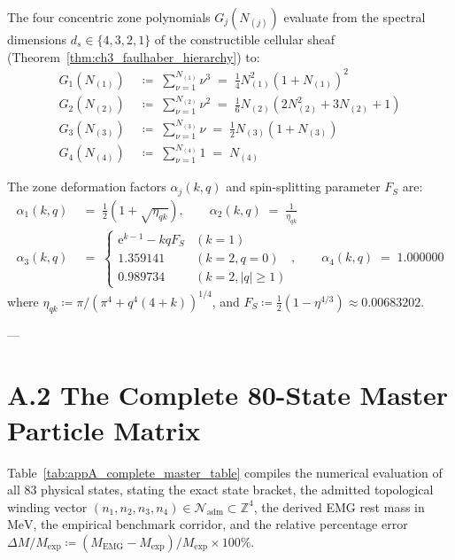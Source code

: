 \documentclass[
    12pt,
    a4paper,
    headings=normal,
    twoside=false,
    open=any,
    parskip=half
]{scrbook}
\newcommand{\eu}{\mathrm{e}}
\newcommand{\spectrumN}{\mathcal{N}_{\text{adm}}}
\begin{document}
The four concentric zone polynomials $G_j(N_{(j)})$ evaluate from the spectral dimensions $d_s \in \{4, 3, 2, 1\}$ of the constructible cellular sheaf (Theorem~\ref{thm:ch3_faulhaber_hierarchy}) to:
\begin{align}
G_1(N_{(1)}) &\;\coloneqq\; \sum_{\nu=1}^{N_{(1)}} \nu^3 \;=\; \frac{1}{4} N_{(1)}^2 \left( 1 + N_{(1)} \right)^2 \label{eq:appA_G1_def} \\
G_2(N_{(2)}) &\;\coloneqq\; \sum_{\nu=1}^{N_{(2)}} \nu^2 \;=\; \frac{1}{6} N_{(2)} \left( 2 N_{(2)}^2 + 3 N_{(2)} + 1 \right) \label{eq:appA_G2_def} \\
G_3(N_{(3)}) &\;\coloneqq\; \sum_{\nu=1}^{N_{(3)}} \nu \;=\; \frac{1}{2} N_{(3)} \left( 1 + N_{(3)} \right) \label{eq:appA_G3_def} \\
G_4(N_{(4)}) &\;\coloneqq\; \sum_{\nu=1}^{N_{(4)}} 1 \;=\; N_{(4)} \label{eq:appA_G4_def}
\end{align}

The zone deformation factors $\alpha_j(k, q)$ and spin-splitting parameter $F_S$ are:
\begin{align}
\alpha_1(k, q) &\;=\; \frac{1}{2}\left( 1 + \sqrt{\eta_{qk}} \right), \qquad \alpha_2(k, q) \;=\; \frac{1}{\eta_{qk}} \label{eq:appA_alpha12_def} \\
\alpha_3(k, q) &\;=\; \begin{cases} \eu^{k-1} - k q F_S & (k = 1) \\ 1.359141 & (k = 2, q = 0) \\ 0.989734 & (k = 2, |q| \ge 1) \end{cases}, \qquad \alpha_4(k, q) \;=\; 1.000000 \label{eq:appA_alpha34_def}
\end{align}
where $\eta_{qk} \coloneqq \pi / (\pi^4 + q^4(4 + k))^{1/4}$, and $F_S \coloneqq \frac{1}{2}(1 - \eta^{4/3}) \approx 0.00683202$.

---

\section{A.2 The Complete 80-State Master Particle Matrix}
\label{sec:appA_complete_master_table}

Table~\ref{tab:appA_complete_master_table} compiles the numerical evaluation of all 83 physical states, stating the exact state bracket, the admitted topological winding vector $(n_1, n_2, n_3, n_4) \in \spectrumN \subset \mathbb{Z}^4$, the derived EMG rest mass in $\text{MeV}$, the empirical benchmark corridor, and the relative percentage error $\Delta M / M_{\text{exp}} \coloneqq (M_{\text{EMG}} - M_{\text{exp}}) / M_{\text{exp}} \times 100\%$.
\end{document}
